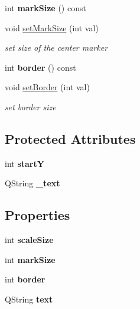 \begin{DoxyCompactItemize}
\mbox{\label{class_awl_1_1_knob_a161b958d8a071a915c80e3053fee3eb9}} 
int {\bfseries mark\+Size} () const
\item 
\mbox{\label{class_awl_1_1_knob_acc686ecaf4e36ede14fa6c8c36865f31}} 
void \hyperlink{class_awl_1_1_knob_acc686ecaf4e36ede14fa6c8c36865f31}{set\+Mark\+Size} (int val)
\begin{DoxyCompactList}\small\item\em set size of the center marker \end{DoxyCompactList}\item 
\mbox{\label{class_awl_1_1_knob_afada3f7e30f46f2497db2c3031a357e1}} 
int {\bfseries border} () const
\item 
\mbox{\label{class_awl_1_1_knob_a76993bec89b50de8902ab5bea7fbc8d8}} 
void \hyperlink{class_awl_1_1_knob_a76993bec89b50de8902ab5bea7fbc8d8}{set\+Border} (int val)
\begin{DoxyCompactList}\small\item\em set border size \end{DoxyCompactList}\end{DoxyCompactItemize}
\subsection*{Protected Attributes}
\begin{DoxyCompactItemize}
\item 
\mbox{\label{class_awl_1_1_knob_aa9ba2d321bc670f5b78526987638385b}} 
int {\bfseries startY}
\item 
\mbox{\label{class_awl_1_1_knob_a032473fa6a0421929b03ad9693fbab6c}} 
Q\+String {\bfseries \+\_\+text}
\end{DoxyCompactItemize}
\subsection*{Properties}
\begin{DoxyCompactItemize}
\item 
\mbox{\label{class_awl_1_1_knob_af03e8fee5cbd0c5ec1206042c9c21d19}} 
int {\bfseries scale\+Size}
\item 
\mbox{\label{class_awl_1_1_knob_a90a1f5c405e529e667df37240b1f0ff4}} 
int {\bfseries mark\+Size}
\item 
\mbox{\label{class_awl_1_1_knob_a0e020fe4b7b6c1ddf64ce22010e72657}} 
int {\bfseries border}
\item 
\mbox{\label{class_awl_1_1_knob_ab34f0dd4fe1c90d0637523a39c15239e}} 
Q\+String {\bfseries text}
\end{DoxyCompactItemize}
